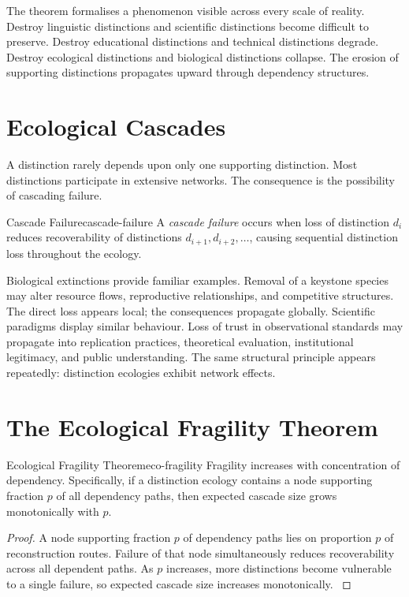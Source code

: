 \documentclass[12pt,twoside,openright]{book}
\begin{document}
The theorem formalises a phenomenon visible across every
scale of reality. Destroy linguistic distinctions and
scientific distinctions become difficult to preserve.
Destroy educational distinctions and technical distinctions
degrade. Destroy ecological distinctions and biological
distinctions collapse. The erosion of supporting
distinctions propagates upward through dependency
structures.

\section{Ecological Cascades}
\label{sec:ch12-cascades}

A distinction rarely depends upon only one supporting
distinction. Most distinctions participate in extensive
networks. The consequence is the possibility of cascading
failure.

\begin{definition}{Cascade Failure}{cascade-failure}
  A \emph{cascade failure} occurs when loss of distinction
  $d_i$ reduces recoverability of distinctions
  $d_{i+1},d_{i+2},\ldots$, causing sequential distinction
  loss throughout the ecology.
\end{definition}

Biological extinctions provide familiar examples. Removal
of a keystone species may alter resource flows,
reproductive relationships, and competitive structures. The
direct loss appears local; the consequences propagate
globally. Scientific paradigms display similar behaviour.
Loss of trust in observational standards may propagate into
replication practices, theoretical evaluation, institutional
legitimacy, and public understanding. The same structural
principle appears repeatedly: distinction ecologies exhibit
network effects.

\section{The Ecological Fragility Theorem}
\label{sec:ch12-fragility}

\begin{theorem}{Ecological Fragility Theorem}{eco-fragility}
  Fragility increases with concentration of dependency.
  Specifically, if a distinction ecology contains a node
  supporting fraction $p$ of all dependency paths, then
  expected cascade size grows monotonically with $p$.
\end{theorem}

\begin{proof}
  A node supporting fraction $p$ of dependency paths lies
  on proportion $p$ of reconstruction routes. Failure of
  that node simultaneously reduces recoverability across
  all dependent paths. As $p$ increases, more distinctions
  become vulnerable to a single failure, so expected
  cascade size increases monotonically.
  \parencite{may1973,levin1998}
\end{proof}
\end{document}
